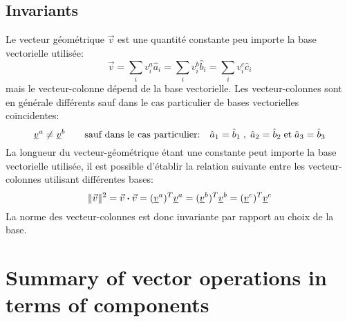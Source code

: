 \subsection{Invariants} 
%
Le vecteur géométrique $\vec{v}$ est une quantité constante peu importe la base vectorielle utilisée: 
\begin{equation}
\vec{v} = \sum_{i} v_i^a \hat{a}_i = \sum_{i} v_i^b \hat{b}_i = \sum_{i} v_i^c \hat{c}_i
\end{equation}
mais le vecteur-colonne dépend de la base vectorielle. Les vecteur-colonnes sont en générale différents sauf dans le cas particulier de bases vectorielles coïncidentes:
\begin{equation}
\underline{v}^{a} \ne \underline{v}^{b} \quad\quad \text{sauf dans le cas particulier:} \quad \hat{a}_1 = \hat{b}_1 \;,\; \hat{a}_2 = \hat{b}_2  \;\text{et}\; \hat{a}_3 = \hat{b}_3 
\end{equation} 
La longueur du vecteur-géométrique étant une constante peut importe la base vectorielle utilisée, il est possible d'établir la relation suivante entre les vecteur-colonnes utilisant différentes bases:
\begin{equation}
\|\vec{v}\|^2 = \vec{v} \boldsymbol{\cdot} \vec{v} = (\underline{v}^{a})^T \underline{v}^{a} = (\underline{v}^{b})^T \underline{v}^{b} = (\underline{v}^{c})^T \underline{v}^{c}
\end{equation}
La norme des vecteur-colonnes est donc invariante par rapport au choix de la base. 






\newpage
\section{Summary of vector operations in terms of components}

